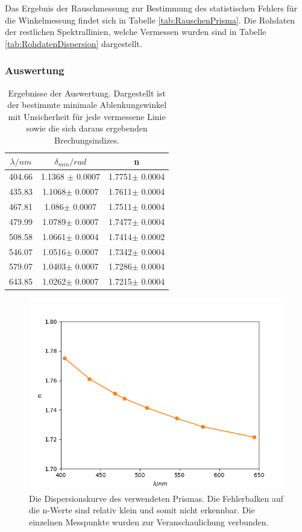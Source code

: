 \documentclass[12pt,a4paper]{article}
\begin{document}
Das Ergebnis der Rauschmessung zur Bestimmung des statistischen Fehlers für die Winkelmessung findet sich in Tabelle \ref{tab:RauschenPrisma}.
Die Rohdaten der restlichen Spektrallinien, welche Vermessen wurden sind in Tabelle \ref{tab:RohdatenDispersion} dargestellt.


\subsubsection{Auswertung}

\begin{table}
\begin{center}
\begin{tabular}{|c|c|c|}
\hline
$\lambda /nm$ & $\delta_{min} / rad$ & n \\
\hline
404.66 & 1.1368 $\pm$ 0.0007 & 1.7751$\pm$ 0.0004\\
\hline
435.83 & 1.1068$\pm$ 0.0007 & 1.7611$\pm$ 0.0004\\
\hline
467.81 & 1.086$\pm$ 0.0007 & 1.7511$\pm$ 0.0004\\
\hline
479.99 & 1.0789$\pm$ 0.0007&1.7477$\pm$ 0.0004\\
\hline
508.58 & 1.0661$\pm$ 0.0004 & 1.7414$\pm$ 0.0002\\
\hline
546.07 & 1.0516$\pm$ 0.0007 & 1.7342$\pm$ 0.0004\\
\hline
579.07 & 1.0403$\pm$ 0.0007 & 1.7286$\pm$ 0.0004\\
\hline
643.85 & 1.0262$\pm$ 0.0007 & 1.7215$\pm$ 0.0004\\
\hline
\end{tabular}
\caption{Ergebnisse der Auswertung. Dargestellt ist der bestimmte minimale Ablenkungswinkel mit Unsicherheit für jede vermessene Linie sowie die sich daraus ergebenden Brechungsindizes.}
\label{tab:AuswertungDispersion}
\end{center}
\end{table}

\begin{figure}
\includegraphics[scale=1.0]{Bilder/Dispersionskurve.png}
\caption{Die Dispersionskurve des verwendeten Prismas. Die Fehlerbalken auf die n-Werte sind relativ klein und somit nicht erkennbar. Die einzelnen Messpunkte wurden zur Veranschaulichung verbunden.}\label{fig:Dispersionskurve}
\end{figure}
\end{document}
